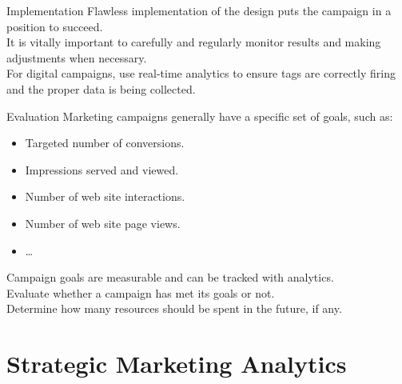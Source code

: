 \documentclass[pdf]{beamer}
\theoremstyle{remark}
\theoremstyle{definition}
\begin{document}
\begin{frame}[t]{Implementation}
Flawless implementation of the design puts the campaign in a position to succeed. \\
\vspace{1.5ex}
It is vitally important to carefully and regularly monitor results and making adjustments when necessary.  \\
\vspace{1.5ex}
For digital campaigns, use real-time analytics to ensure tags are correctly firing and the proper data is being collected.
\end{frame}

\begin{frame}[t]{Evaluation}
Marketing campaigns generally have a specific set of goals, such as:
\vspace{-0.5ex}
\small
\begin{itemize} 
\item Targeted number of conversions.
\item Impressions served and viewed.
\item Number of web site interactions.
\item Number of web site page views.
\item \ldots 
\end{itemize}
\vspace{-0.5ex}
Campaign goals are measurable and can be tracked with analytics. \\
\vspace{1.5ex}
Evaluate whether a campaign has met its goals or not. \\
\vspace{1.5ex} 
Determine how many resources should be spent in the future, if any.
\end{frame}

\section{Strategic Marketing Analytics}
\end{document}
